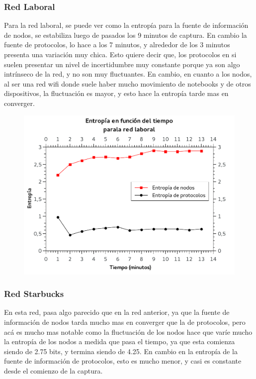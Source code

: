 \FloatBarrier
\subsubsection{Red Laboral}

Para la red laboral, se puede ver como la entropía para la fuente de información de nodos, se estabiliza luego de pasados los 9 minutos de captura. En cambio la fuente de protocolos, lo hace a los 7 minutos, y alrededor de los 3 minutos presenta una variación muy chica. Esto quiere decir que, los protocolos en si suelen presentar un nivel de incertidumbre muy constante porque ya son algo intrínseco de la red, y no son muy fluctuantes. En cambio, en cuanto a los nodos, al ser una red wifi donde suele haber mucho movimiento de notebooks y de otros dispositivos, la fluctuación es mayor, y esto hace la entropía tarde mas en converger.

\begin{figure}[h!]
  \begin{center}
    \includegraphics{graficos/entropia-tiempo-bf.pdf}
	\caption{}
    \label{fig:entropy-baufest}  
  \end{center}
\end{figure}

\FloatBarrier
\subsubsection{Red Starbucks}

En esta red, pasa algo parecido que en la red anterior, ya que la fuente de información de nodos tarda mucho mas en converger que la de protocolos, pero acá es mucho mas notable como la fluctuación de los nodos hace que varíe mucho la entropía de los nodos a medida que pasa el tiempo, ya que esta comienza siendo de 2.75 bits, y termina siendo de 4.25. En cambio en la entropía de la fuente de información de protocolos, esto es mucho menor, y casi es constante desde el comienzo de la captura. \\


